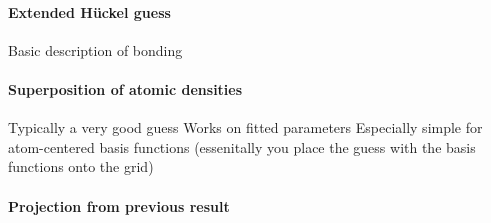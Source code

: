 \paragraph{Extended Hückel guess}
Basic description of bonding 


\paragraph{Superposition of atomic densities}
Typically a very good guess
Works on fitted parameters
Especially simple for atom-centered basis functions
(essenitally you place the guess with the basis functions onto the grid)


\paragraph{Projection from previous result}
